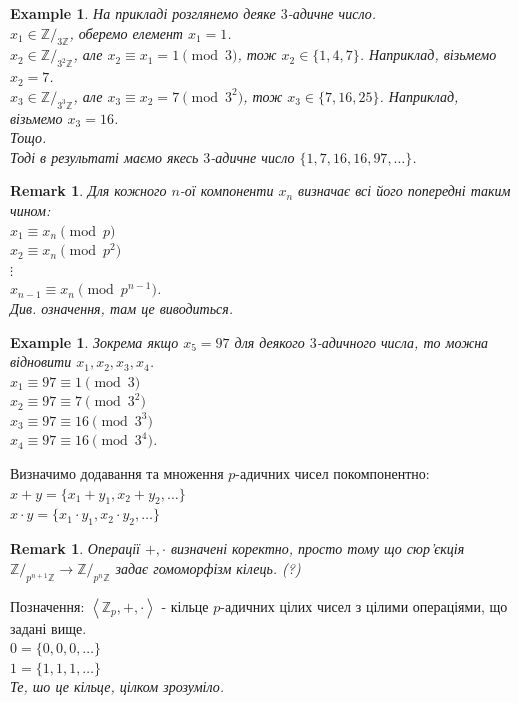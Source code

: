 \documentclass[a4paper, 10pt]{article}
\theoremstyle{theoremdd}
\theoremstyle{theoremdd}
\theoremstyle{theoremdd}
\theoremstyle{theoremdd}
\newtheorem{example}[theorem]{Example}
\theoremstyle{theoremdd}
\theoremstyle{theoremdd}
\newtheorem{remark}[theorem]{Remark}
\theoremstyle{theoremdd}
\theoremstyle{theoremdd}
\begin{document}
\begin{example}
На прикладі розглянемо деяке $3$-адичне число.\\
$x_1 \in \mathbb{Z}/_{3 \mathbb{Z}}$, оберемо елемент $x_1 = 1$.\\
$x_2 \in \mathbb{Z}/_{3^2 \mathbb{Z}}$, але $x_2 \equiv x_1 = 1 \pmod 3$, тож $x_2 \in \{1,4,7\}$. Наприклад, візьмемо $x_2 = 7$.\\
$x_3 \in \mathbb{Z}/_{3^3 \mathbb{Z}}$, але $x_3 \equiv x_2 = 7 \pmod {3^2}$, тож $x_3 \in \{7,16,25\}$. Наприклад, візьмемо $x_3 = 16$.\\
Тощо.\\
Тоді в результаті маємо якесь $3$-адичне число $\{1,7,16,16,97,\dots\}$.
\end{example}

\begin{remark}
Для кожного $n$-ої компоненти $x_n$ визначає всі його попередні таким чином:\\
$x_1 \equiv x_n \pmod p$\\
$x_2 \equiv x_n \pmod {p^2}$\\
$\vdots$\\
$x_{n-1} \equiv x_n \pmod {p^{n-1}}$.\\
\textit{Див. означення, там це виводиться.}
\end{remark}

\begin{example}
Зокрема якщо $x_5 = 97$ для деякого $3$-адичного числа, то можна відновити $x_1,x_2,x_3,x_4$.\\
$x_1 \equiv 97 \equiv 1 \pmod 3$\\
$x_2 \equiv 97 \equiv 7 \pmod {3^2}$\\
$x_3 \equiv 97 \equiv 16 \pmod {3^3}$\\
$x_4 \equiv 97 \equiv 16 \pmod {3^4}$.
\end{example}

Визначимо додавання та множення $p$-адичних чисел покомпонентно:\\
$x+y = \{ x_1+y_1, x_2+y_2,\dots \}$\\
$x \cdot y = \{x_1 \cdot y_1, x_2 \cdot y_2, \dots\}$

\begin{remark}
Операції $+, \cdot$ визначені коректно, просто тому що сюр'єкція $\mathbb{Z}/_{p^{n+1} \mathbb{Z}} \to \mathbb{Z}/_{p^n \mathbb{Z}}$ задає гомоморфізм кілець. (?)
\end{remark}

Позначення: $\left<\mathbb{Z}_p,+,\cdot\right>$ - кільце $p$-адичних цілих чисел з цілими операціями, що задані вище.\\
$0 = \{0,0,0,\dots\}$\\
$1 = \{1,1,1,\dots\}$\\
\textit{Те, шо це кільце, цілком зрозуміло.}
\end{document}
